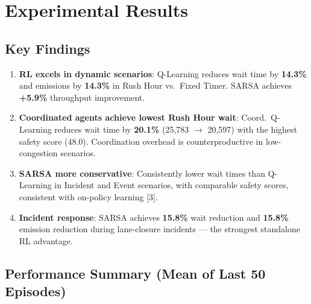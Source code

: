 \documentclass[11pt, a4paper]{article}
\begin{document}
\section{Experimental Results}

\subsection{Key Findings}

\begin{enumerate}[nosep, leftmargin=*]
    \item \textbf{RL excels in dynamic scenarios}: Q-Learning reduces wait time by \textbf{14.3\%} and emissions by \textbf{14.3\%} in Rush Hour vs.\ Fixed Timer. SARSA achieves \textbf{+5.9\%} throughput improvement.
    \item \textbf{Coordinated agents achieve lowest Rush Hour wait}: Coord.\ Q-Learning reduces wait time by \textbf{20.1\%} (25,783 $\to$ 20,597) with the highest safety score (48.0). Coordination overhead is counterproductive in low-congestion scenarios.
    \item \textbf{SARSA more conservative}: Consistently lower wait times than Q-Learning in Incident and Event scenarios, with comparable safety scores, consistent with on-policy learning [3].
    \item \textbf{Incident response}: SARSA achieves \textbf{15.8\%} wait reduction and \textbf{15.8\%} emission reduction during lane-closure incidents --- the strongest standalone RL advantage.
\end{enumerate}

\subsection{Performance Summary (Mean of Last 50 Episodes)}
\end{document}
